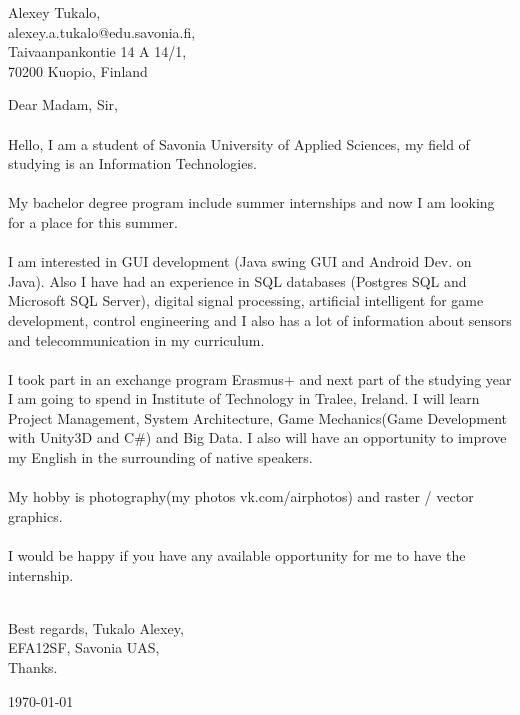 \documentclass[english]{article}
\date{}
\begin{document}
\begin{flushright}
Alexey Tukalo,\\
alexey.a.tukalo@edu.savonia.fi,\\
Taivaanpankontie 14 A 14/1,\\
70200 Kuopio, Finland
\end{flushright}

Dear Madam, Sir,\\\\
Hello, I am a student of Savonia University of Applied Sciences, my field of studying is an Information Technologies.\\\\
My bachelor degree program include summer internships and now I am looking for a place for this summer. \\\\
I am interested in GUI development (Java swing GUI and Android Dev. on Java). Also I have had an experience in SQL databases (Postgres SQL and Microsoft SQL Server), digital signal processing, artificial intelligent for game development, control engineering and I also has a lot of information about sensors and telecommunication in my curriculum. \\\\
I took part in an exchange program Erasmus+ and next part of the studying year I am going to spend in Institute of Technology in Tralee, Ireland. I will learn Project Management, System Architecture, Game Mechanics(Game Development with Unity3D and C\#) and Big Data. I also will have an opportunity to improve my English in the surrounding of native speakers. 
 \\\\
My hobby is photography(my photos vk.com/airphotos) and raster / vector graphics. \\\\
I would be happy if you have any available opportunity for me to have the internship.\\\\

\begin{flushright}

Best regards, Tukalo Alexey, \\EFA12SF, Savonia UAS,\\
Thanks.     

\end{flushright}

\today
\end{document}
